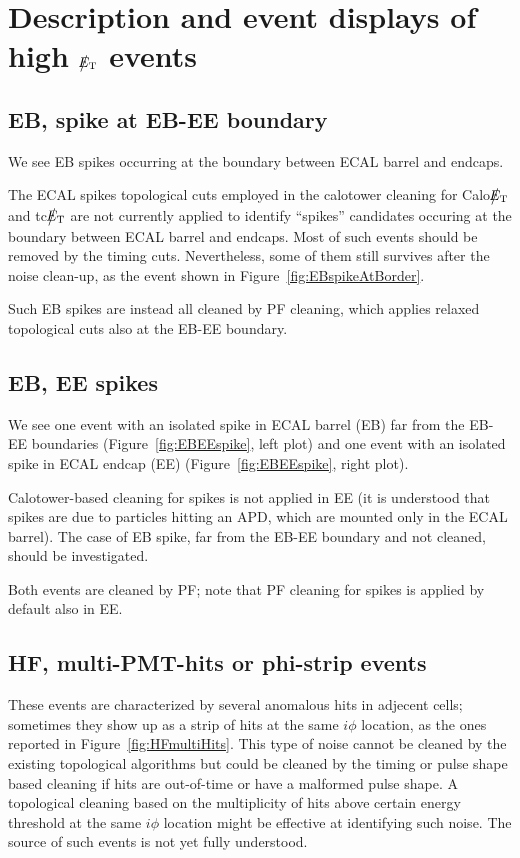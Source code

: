 \section{Description and event displays of high $\big\slash\hspace{-1.6ex}{E_\text{T}}$ events}

\subsection{EB, spike at EB-EE boundary}
We see EB spikes occurring at the boundary between ECAL barrel and endcaps.

The ECAL spikes topological cuts employed in the calotower cleaning for Calo$\big\slash\hspace{-1.6ex}{E_\text{T}}$ and tc$\big\slash\hspace{-1.6ex}{E_\text{T}}$ 
are not currently applied to identify ``spikes'' candidates occuring at the boundary between ECAL barrel and endcaps. 
Most of such events should be removed by the timing cuts. Nevertheless, some of them still survives 
after the noise clean-up, as the event shown in Figure~\ref{fig:EBspikeAtBorder}.

Such EB spikes are instead all cleaned by PF cleaning, which applies relaxed topological cuts also at the EB-EE boundary.

\subsection{EB, EE spikes}
We see one event with an isolated spike in ECAL barrel (EB) far from the EB-EE boundaries 
(Figure~\ref{fig:EBEEspike}, left plot) and one event with an isolated spike in ECAL 
endcap (EE) (Figure~\ref{fig:EBEEspike}, right plot).

Calotower-based cleaning for spikes is not applied in EE (it is understood that 
spikes are due to particles hitting an APD, which are mounted only in the ECAL barrel). 
The case of EB spike, far from the EB-EE boundary and not cleaned, should be investigated.

Both events are cleaned by PF; note that PF cleaning for spikes is applied by default also in EE.

\subsection{HF, multi-PMT-hits or phi-strip events}
These events are characterized by several anomalous hits in adjecent cells; sometimes they show up as
a strip of hits at the same $i\phi$ location, as the ones reported in Figure~\ref{fig:HFmultiHits}. 
This type of noise cannot be cleaned by the existing topological algorithms but could 
be cleaned by the timing or pulse shape based 
cleaning if hits are out-of-time or have a malformed pulse shape. 
A topological cleaning based on the multiplicity of hits above certain energy threshold 
at the same $i\phi$ location might be effective at identifying such noise.
The source of such events is not yet fully understood.

